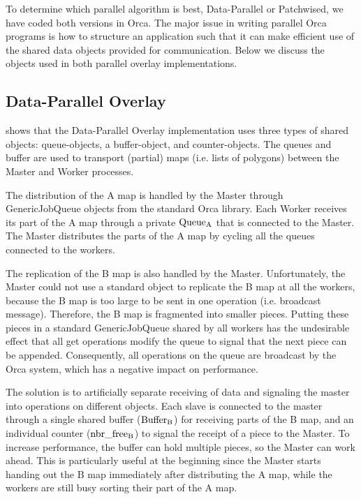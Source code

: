 
To determine which parallel algorithm is best, Data-Parallel or Patchwised, we
have coded both versions in Orca. The major issue in writing parallel Orca
programs is how to structure an application such that it can make efficient use
of the shared data objects provided for communication. Below we discuss the
objects used in both parallel overlay implementations.

\subsection{Data-Parallel Overlay}

\begin{figure}[hbtp]
  \begin{centering}
    \hspace{0cm}
  \end{centering}
\end{figure}

 shows that
the Data-Parallel Overlay implementation uses three types of
shared objects: queue-objects, a buffer-object, and counter-objects.
The queues and buffer are used to transport (partial) maps (i.e. lists of
polygons) between the Master and Worker processes.

The distribution of the A map is handled by the Master through 
GenericJobQueue objects from the standard Orca library.  Each Worker
receives its part of the A map through a private $\rm{Queue_{A}}$ that
is connected to the Master.  The Master distributes the parts of the A
map by cycling all the queues connected to the workers.

The replication of the B map is also handled by the Master.
Unfortunately, the Master could not use a standard object to replicate
the B map at all the workers, because the B map is too large to be sent
in one operation (i.e. broadcast message). Therefore, the B map is
fragmented into smaller pieces. Putting these pieces in a standard
GenericJobQueue shared by all workers has the undesirable effect that all get
operations modify the queue to signal that the next piece can be
appended. Consequently, all operations on the queue are broadcast by the Orca
system, which has a negative impact on performance.

The solution is to artificially separate receiving of data and signaling
the master into operations on different objects. Each slave is
connected to the master through a single shared buffer ($\rm{Buffer_{B}}$)
for receiving parts of the B map, and an individual counter
($\rm{nbr\_free_{B}}$) to signal the receipt of a piece to the Master.
To increase performance, the buffer can hold multiple pieces, so the Master can
work ahead. This is particularly useful at the beginning since the Master
starts handing out the B map immediately after distributing the A map,
while the workers are still busy sorting their part of the A map.

